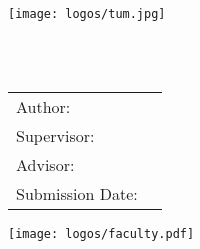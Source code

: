 \begin{titlepage}
  \centering

  \vspace{10mm}
  \texttt{[image: logos/tum.jpg]}

  \vspace{5mm}
  {\huge\MakeUppercase{\getFaculty{}}}\\

  \vspace{5mm}
  {\large\MakeUppercase{\getUniversity{}}}\\

  \vspace{15mm}
  {\Large \getDoctype{}}
	
  \vspace{15mm}
  {\huge\bfseries \getTitleGer{}}

  \vspace{10mm}
  {\huge\bfseries \getTitle{}}

  \vspace{15mm}
  \begin{tabular}{l l}
    Author: & \getAuthor{} \\
    Supervisor: & \getSupervisor{} \\
    Advisor: & \getAdvisor{} \\
    Submission Date: & \getSubmissionDate{} \\
  \end{tabular}

	\centering
  \vspace{10mm}
  \texttt{[image: logos/faculty.pdf]}
\end{titlepage}

